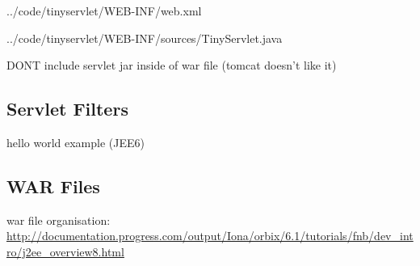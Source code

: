 \documentclass[a4paper,10pt,twoside]{book}
\begin{document}

{../code/tinyservlet/WEB-INF/web.xml}


{../code/tinyservlet/WEB-INF/sources/TinyServlet.java}

DONT include servlet jar inside of war file (tomcat doesn't like it)

\subsection{Servlet Filters}

hello world example (JEE6)

\subsection{WAR Files}

war file organisation: \url{http://documentation.progress.com/output/Iona/orbix/6.1/tutorials/fnb/dev_intro/j2ee_overview8.html}


\ifx\wholebook\relax\else
   
   
\end{document}
